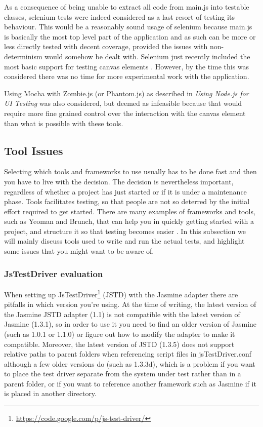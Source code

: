 \documentclass[11pt]{article}
\begin{document}
As a consequence of being unable to extract all code from main.js into testable classes, selenium tests were indeed considered as a last resort of testing its behaviour. This would be a reasonably sound usage of selenium because main.js is basically the most top level part of the application and as such can be more or less directly tested with decent coverage, provided the issues with non-determinism would somehow be dealt with. Selenium just recently included the most basic support for testing canvas elements \cite[p.~165-166]{Selenium2}. However, by the time this was considered there was no time for more experimental work with the application.

Using Mocha with Zombie.js (or Phantom.js) as described in \emph{Using Node.js for UI Testing} \cite{UsingNode} was also considered, but deemed as infeasible because that would require more fine grained control over the interaction with the canvas element than what is possible with these tools.

\subsection{Tool Issues}

Selecting which tools and frameworks to use usually has to be done fast and then you have to live with the decision. The decision is nevertheless important, regardless of whether a project has just started or if it is under a maintenance phase. Tools facilitates testing, so that people are not so deterred by the initial effort required to get started. There are many examples of frameworks and tools, such as Yeoman and Brunch, that can help you in quickly getting started with a project, and structure it so that testing becomes easier \cite[questions~11]{Edelstam}. In this subsection we will mainly discuss tools used to write and run the actual tests, and highlight some issues that you might want to be aware of.

\subsubsection{JsTestDriver evaluation}
\label{subsec:jstestdriver}

When setting up JsTestDriver\footnote{\url{https://code.google.com/p/js-test-driver/}} (JSTD) with the Jasmine adapter there are pitfalls in which version you're using. At the time of writing, the latest version of the Jasmine JSTD adapter (1.1) is not compatible with the latest version of Jasmine (1.3.1), so in order to use it you need to find an older version of Jasmine (such as 1.0.1 or 1.1.0) or figure out how to modify the adapter to make it compatible. Moreover, the latest version of JSTD (1.3.5) does not support relative paths to parent folders when referencing script files in jsTestDriver.conf although a few older versions do (such as 1.3.3d), which is a problem if you want to place the test driver separate from the system under test rather than in a parent folder, or if you want to reference another framework such as Jasmine if it is placed in another directory. %
\end{document}
